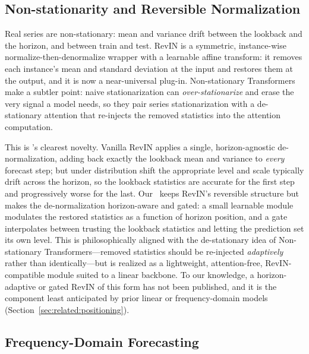 \subsection{Non-stationarity and Reversible Normalization}
\label{sec:related:norm}

Real series are non-stationary: mean and variance drift between the lookback and
the horizon, and between train and test. RevIN \citep{kim2022revin} is a
symmetric, instance-wise normalize-then-denormalize wrapper with a learnable
affine transform: it removes each instance's mean and standard deviation at the
input and restores them at the output, and it is now a near-universal plug-in.
Non-stationary Transformers \citep{liu2022nonstationary} make a subtler point:
naive stationarization can \emph{over-stationarize} and erase the very signal a
model needs, so they pair series stationarization with a de-stationary attention
that re-injects the removed statistics into the attention computation.

This is \method's clearest novelty. Vanilla RevIN applies a single,
horizon-agnostic de-normalization, adding back exactly the lookback mean and
variance to \emph{every} forecast step; but under distribution shift the
appropriate level and scale typically drift across the horizon, so the lookback
statistics are accurate for the first step and progressively worse for the last.
Our \arevin\ keeps RevIN's reversible structure but makes the de-normalization
horizon-aware and gated: a small learnable module modulates the restored
statistics as a function of horizon position, and a gate interpolates between
trusting the lookback statistics and letting the prediction set its own level.
This is philosophically aligned with the de-stationary idea of Non-stationary
Transformers---removed statistics should be re-injected \emph{adaptively} rather
than identically---but is realized as a lightweight, attention-free,
RevIN-compatible module suited to a linear backbone. To our knowledge, a
horizon-adaptive or gated RevIN of this form has not been published, and it is
the component least anticipated by prior linear or frequency-domain models
(Section~\ref{sec:related:positioning}).

\subsection{Frequency-Domain Forecasting}
\label{sec:related:freq}

